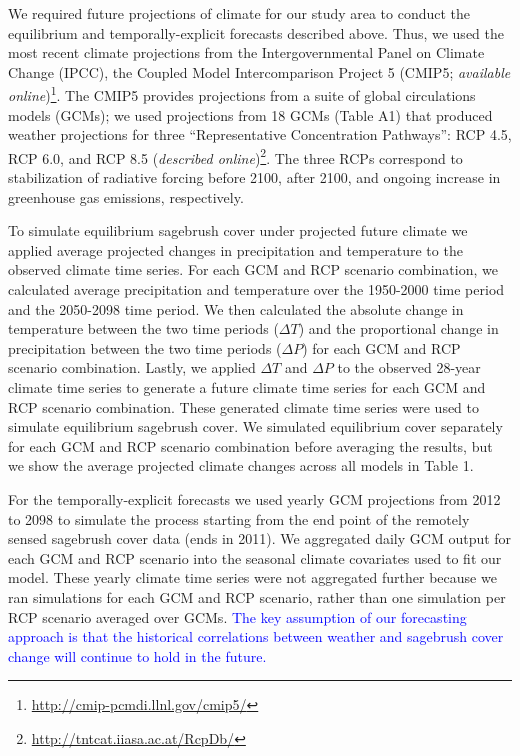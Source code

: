 \documentclass[12pt,]{article}
\let\rmarkdownfootnote\footnote%
\def\footnote{\protect\rmarkdownfootnote}
\begin{document}
We required future projections of climate for our study area to conduct
the equilibrium and temporally-explicit forecasts described above. Thus,
we used the most recent climate projections from the Intergovernmental
Panel on Climate Change (IPCC), the Coupled Model Intercomparison
Project 5 (CMIP5; \emph{available online})\footnote{\url{http://cmip-pcmdi.llnl.gov/cmip5/}}.
The CMIP5 provides projections from a suite of global circulations
models (GCMs); we used projections from 18 GCMs (Table A1) that produced
weather projections for three ``Representative Concentration Pathways'':
RCP 4.5, RCP 6.0, and RCP 8.5 (\emph{described online})\footnote{\url{http://tntcat.iiasa.ac.at/RcpDb/}}.
The three RCPs correspond to stabilization of radiative forcing before
2100, after 2100, and ongoing increase in greenhouse gas emissions,
respectively.

To simulate equilibrium sagebrush cover under projected future climate
we applied average projected changes in precipitation and temperature to
the observed climate time series. For each GCM and RCP scenario
combination, we calculated average precipitation and temperature over
the 1950-2000 time period and the 2050-2098 time period. We then
calculated the absolute change in temperature between the two time
periods (\(\Delta T\)) and the proportional change in precipitation
between the two time periods (\(\Delta P\)) for each GCM and RCP
scenario combination. Lastly, we applied \(\Delta T\) and \(\Delta P\)
to the observed 28-year climate time series to generate a future climate
time series for each GCM and RCP scenario combination. These generated
climate time series were used to simulate equilibrium sagebrush cover.
We simulated equilibrium cover separately for each GCM and RCP scenario
combination before averaging the results, but we show the average
projected climate changes across all models in Table 1.

For the temporally-explicit forecasts we used yearly GCM projections
from 2012 to 2098 to simulate the process starting from the end point of
the remotely sensed sagebrush cover data (ends in 2011). We aggregated
daily GCM output for each GCM and RCP scenario into the seasonal climate
covariates used to fit our model. These yearly climate time series were
not aggregated further because we ran simulations for each GCM and RCP
scenario, rather than one simulation per RCP scenario averaged over
GCMs.
\textcolor{blue}{The key assumption of our forecasting approach is that the historical correlations between weather and sagebrush cover change will continue to hold in the future.}
\end{document}
